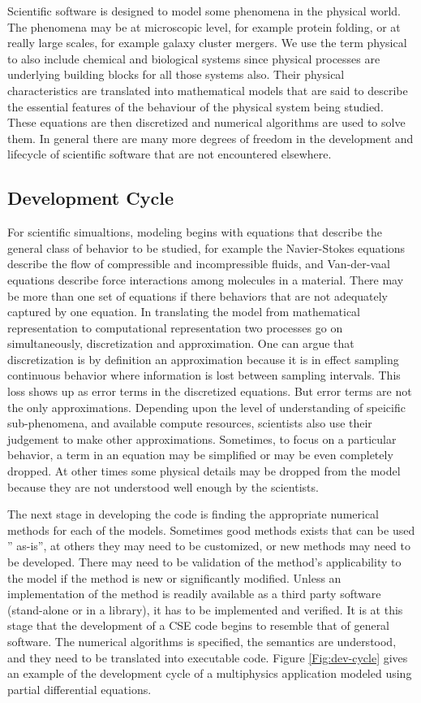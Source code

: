 \label{sec:lifecycle} 
Scientific software is designed to model some phenomena in the
physical world. The phenomena may be at microscopic level, for example
protein folding, or at really large scales, for example galaxy cluster
mergers. We use the term physical to also include chemical and
biological systems since physical processes are underlying building
blocks for all those systems also. Their physical characteristics are
translated into mathematical models that are said to describe the
essential features of the behaviour of the physical system being
studied. These equations are then discretized and numerical algorithms
are used to solve them. In general there are many more degrees of
freedom in the development and lifecycle of scientific software
that are not encountered elsewhere. 

\subsection{Development Cycle}
\label{sec:dev-cycle}
For scientific simualtions, modeling begins with equations that describe the
general class of behavior to be studied, for example the Navier-Stokes
equations describe the flow of compressible and incompressible
fluids, and Van-der-vaal equations describe force interactions among
molecules in a material. There may be more than one set of equations
if there behaviors that are not adequately captured by one
equation. In translating the model from mathematical representation to
computational representation two processes go on simultaneously,
discretization and approximation. One can argue that discretization is
by definition an approximation because it is in effect sampling
continuous behavior where information is lost between sampling
intervals. This loss shows up as error terms in the discretized
equations. But error terms are not the only
approximations. Depending upon the level of understanding of speicific
sub-phenomena, and available compute resources, scientists also 
use their judgement to make other approximations. Sometimes, to focus on a
particular behavior, a term in an equation may be simplified or may be even completely
dropped. At other times some physical details may be dropped
from the model because they are not understood well enough by the
scientists. 

The next stage in developing the code is finding the appropriate
numerical methods for each of the models. Sometimes good methods exists that
can be used '' as-is'', at others they may need to be customized, or new
methods may need to be developed. There may need to be validation of
the method's applicability to the model if the method is new or
significantly modified. Unless an implementation of the method is
readily available as a third party software (stand-alone or in a
library), it has to be implemented and verified. It is at this stage
that the development of a CSE code begins to resemble that of general
software. The numerical algorithms is specified, the semantics are
understood, and they need to be translated into executable
code. Figure \ref{Fig:dev-cycle} gives an example of the development
cycle of a multiphysics application modeled using partial differential
equations. 

